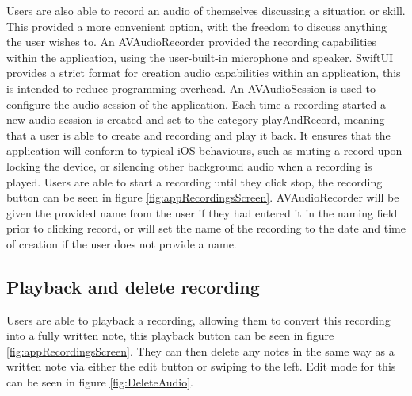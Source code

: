 \documentclass{l4proj}
\begin{document}
Users are also able to record an audio of themselves discussing a situation or skill. This provided a more convenient option, with the freedom to discuss anything the user wishes to. An AVAudioRecorder provided the recording capabilities within the application, using the user-built-in microphone and speaker. SwiftUI provides a strict format for creation audio capabilities within an application, this is intended to reduce programming overhead. An AVAudioSession is used to configure the audio session of the application. Each time a recording started a new audio session is created and set to the category playAndRecord, meaning that a user is able to create and recording and play it back. It ensures that the application will conform to typical iOS behaviours, such as muting a record upon locking the device, or silencing other background audio when a recording is played. 
Users are able to start a recording until they click stop, the recording button can be seen in figure \ref{fig:appRecordingsScreen}. AVAudioRecorder will be given the provided name from the user if they had entered it in the naming field prior to clicking record, or will set the name of the recording to the date and time of creation if the user does not provide a name. 

\subsection{Playback and delete recording}

Users are able to playback a recording, allowing them to convert this recording into a fully written note, this playback button can be seen in figure \ref{fig:appRecordingsScreen}. They can then delete any notes in the same way as a written note via either the edit button or swiping to the left. Edit mode for this can be seen in figure \ref{fig:DeleteAudio}.
\end{document}
